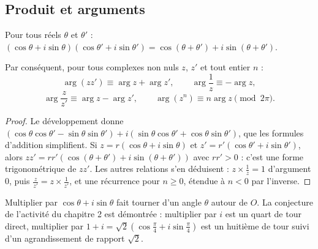 \subsection{Produit et arguments}
\begin{theorem}
Pour tous réels $\theta$ et $\theta'$ : $(\cos\theta+i\sin\theta)(\cos\theta'+i\sin\theta')=\cos(\theta+\theta')+i\sin(\theta+\theta')$.\par
Par conséquent, pour tous complexes non nuls $z$, $z'$ et tout entier $n$ :
\[\arg(zz')\equiv\arg z+\arg z',\qquad\arg\frac1z\equiv-\arg z,\]
\[\arg\frac z{z'}\equiv\arg z-\arg z',\qquad\arg\left(z^n\right)\equiv n\arg z\pmod{2\pi}.\]
\end{theorem}
\begin{proof}
Le développement donne $(\cos\theta\cos\theta'-\sin\theta\sin\theta')+i(\sin\theta\cos\theta'+\cos\theta\sin\theta')$, que les formules d'addition simplifient. Si $z=r(\cos\theta+i\sin\theta)$ et $z'=r'(\cos\theta'+i\sin\theta')$, alors $zz'=rr'(\cos(\theta+\theta')+i\sin(\theta+\theta'))$ avec $rr'>0$ : c'est une forme trigonométrique de $zz'$. Les autres relations s'en déduisent : $z\times\frac1z=1$ d'argument $0$, puis $\frac z{z'}=z\times\frac1{z'}$, et une récurrence pour $n\ge0$, étendue à $n<0$ par l'inverse.
\end{proof}
\begin{keypoint}[Interprétation]
Multiplier par $\cos\theta+i\sin\theta$ fait tourner d'un angle $\theta$ autour de $O$. La conjecture de l'activité du chapitre 2 est démontrée : multiplier par $i$ est un quart de tour direct, multiplier par $1+i=\sqrt2\left(\cos\frac\pi4+i\sin\frac\pi4\right)$ est un huitième de tour suivi d'un agrandissement de rapport $\sqrt2$.
\end{keypoint}

